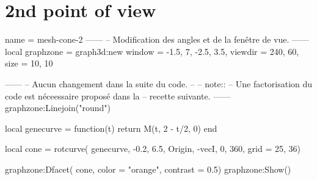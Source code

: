 \documentclass[varwidth, border = 3pt]{standalone}
\begin{document}
\section*{2nd point of view}

\begin{luadraw}{name = mesh-cone-2}
------
-- Modification des angles et de la fenêtre de vue.
------
    local graphzone = graph3d:new{
        window  = {-1.5, 7, -2.5, 3.5},
        viewdir = {240, 60},
        size    = {10, 10}
    }

------
-- Aucun changement dans la suite du code.
--
-- note::
--     Une factorisation du code est néceessaire proposé dans la
--     recette suivante.
------
    graphzone:Linejoin("round")

    local genecurve = function(t)
        return M(t, 2 - t/2, 0)
    end

    local cone = rotcurve(
        genecurve,
        -0.2, 6.5,
        {Origin, -vecI},
        0, 360,
        {grid = {25, 36}})

    graphzone:Dfacet(
        cone,
        {color    = "orange",
         contrast = 0.5})
    graphzone:Show()
\end{luadraw}
\end{document}
